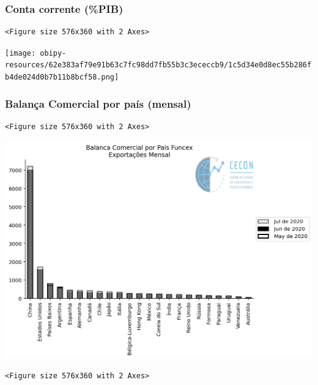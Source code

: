 \documentclass[11pt]{article}
\begin{document}
\subsubsection{Conta corrente (\%PIB)}
\label{sec:org51e8e44}

\begin{verbatim}
<Figure size 576x360 with 2 Axes>
\end{verbatim}


\begin{center}
\texttt{[image: obipy-resources/62e383af79e91b63c7fc98dd7fb55b3c3ececcb9/1c5d34e0d8ec55b286fb4de024d0b7b11b8bcf58.png]}
\end{center}

\subsubsection{Balança Comercial por país (mensal)}
\label{sec:org0a67251}

\begin{verbatim}
<Figure size 576x360 with 2 Axes>
\end{verbatim}


\begin{center}
\includegraphics[width=.9\linewidth]{obipy-resources/62e383af79e91b63c7fc98dd7fb55b3c3ececcb9/c3ff075133f390045c0fb620ae17d0d8ae93f0b8.png}
\end{center}


\begin{verbatim}
<Figure size 576x360 with 2 Axes>
\end{verbatim}
\end{document}
